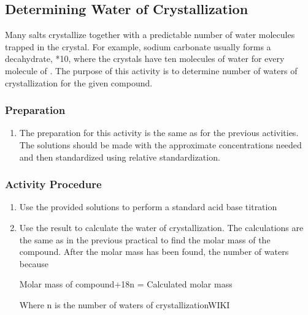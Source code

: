 \subsection{Determining Water of Crystallization}

Many salts crystallize together with a predictable number of water molecules trapped in the crystal. For example, sodium carbonate usually forms a decahydrate, *10, where the crystals have ten molecules of water for every molecule of . The purpose of this activity is to determine number of waters of crystallization for the given compound.

\subsubsection{Preparation}
\begin{enumerate}
\item The preparation for this activity is the same as for the previous activities. The solutions should be made with the approximate concentrations needed and then standardized using relative standardization.
\end{enumerate}
\subsubsection{Activity Procedure}
\begin{enumerate}
\item {Use the provided solutions to perform a standard acid base titration}
\item{Use the result to calculate the water of crystallization. The calculations are the same as in the previous practical to find the molar mass of the compound. After the molar mass has been found, the number of waters because 


Molar mass of compound+18n = Calculated  molar  mass}

Where n is the number of waters of crystallizationWIKI
\end{enumerate} 